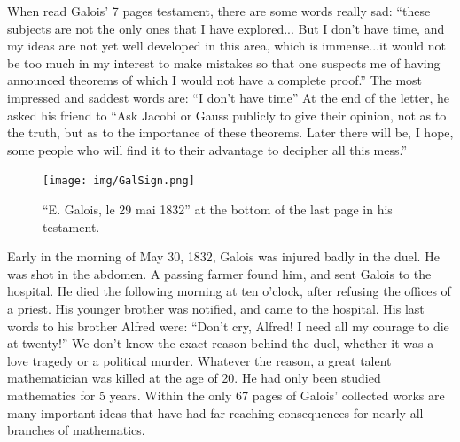\documentclass[b5paper]{article}
\begin{document}
When read Galois' 7 pages testament, there are some words really sad: ``these subjects are not the only ones that I have explored... But I don't have time, and my ideas are not yet well developed in this area, which is immense...it would not be too much in my interest to make mistakes so that one suspects me of having announced theorems of which I would not have a complete proof.'' The most impressed and saddest words are: ``I don't have time'' At the end of the letter, he asked his friend to ``Ask Jacobi or Gauss publicly to give their opinion, not as to the truth, but as to the importance of these theorems. Later there will be, I hope, some people who will find it to their advantage to decipher all this mess.''\cite{Galois-1832}

\begin{figure}[htbp]
 \centering
 \texttt{[image: img/GalSign.png]}
 \captionsetup{labelformat=empty}
 \caption{``E. Galois, le 29 mai 1832'' at the bottom of the last page in his testament.}
 \label{fig:GalSign}
\end{figure}

Early in the morning of May 30, 1832, Galois was injured badly in the duel. He was shot in the abdomen. A passing farmer found him, and sent Galois to the hospital. He died the following morning at ten o'clock, after refusing the offices of a priest. His younger brother was notified, and came to the hospital. His last words to his brother Alfred were: ``Don't cry, Alfred! I need all my courage to die at twenty!'' We don't know the exact reason behind the duel, whether it was a love tragedy or a political murder. Whatever the reason, a great talent mathematician was killed at the age of 20. He had only been studied mathematics for 5 years. Within the only 67 pages of Galois' collected works are many important ideas that have had far-reaching consequences for nearly all branches of mathematics.
\end{document}
